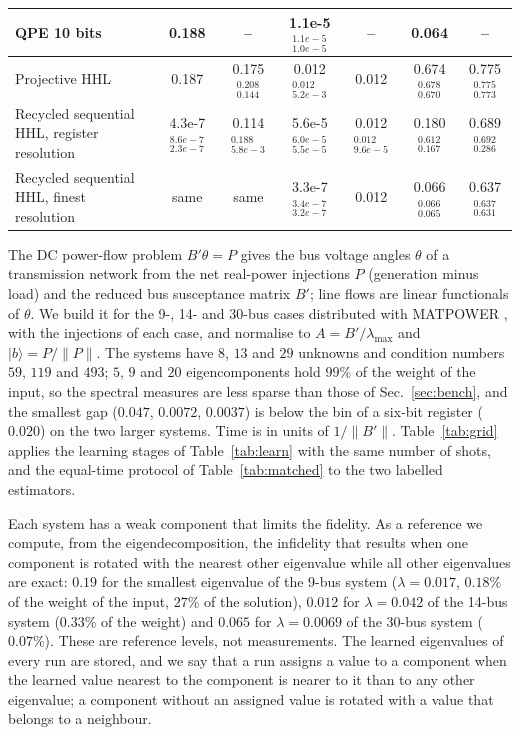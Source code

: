 \documentclass[journal]{IEEEtran}
\newcommand{\lmax}{\lambda_{\max}}
\begin{document}
\begin{table}[t]
\begin{tabular}{lcccccc}
QPE 10 bits & 0.188 & -- & 1.1e-5$_{1.0e-5}^{1.1e-5}$ & -- & 0.064 & --\\
\midrule
Projective HHL & 0.187 & 0.175$_{0.144}^{0.208}$ & 0.012$_{5.2e-3}^{0.012}$ & 0.012 & 0.674$_{0.670}^{0.678}$ & 0.775$_{0.773}^{0.775}$\\
Recycled sequential HHL, register resolution & 4.3e-7$_{2.3e-7}^{8.6e-7}$ & 0.114$_{5.8e-3}^{0.188}$ & 5.6e-5$_{5.5e-5}^{6.0e-5}$ & 0.012$_{9.6e-5}^{0.012}$ & 0.180$_{0.167}^{0.612}$ & 0.689$_{0.286}^{0.692}$\\
Recycled sequential HHL, finest resolution & same & same & 3.3e-7$_{3.2e-7}^{3.4e-7}$ & 0.012 & 0.066$_{0.065}^{0.066}$ & 0.637$_{0.631}^{0.637}$\\
\bottomrule
\end{tabular}
\end{table}

The DC power-flow problem $B'\theta=P$ gives the bus voltage angles $\theta$ of a transmission network from the net real-power injections $P$ (generation minus load) and the reduced bus susceptance matrix $B'$; line flows are linear functionals of $\theta$. We build it for the 9-, 14- and 30-bus cases distributed with MATPOWER \cite{Zimmerman2011}, with the injections of each case, and normalise to $A=B'/\lmax$ and $|b\rangle=P/\|P\|$. The systems have $8$, $13$ and $29$ unknowns and condition numbers $59$, $119$ and $493$; $5$, $9$ and $20$ eigencomponents hold $99\%$ of the weight of the input, so the spectral measures are less sparse than those of Sec.~\ref{sec:bench}, and the smallest gap ($0.047$, $0.0072$, $0.0037$) is below the bin of a six-bit register ($0.020$) on the two larger systems. Time is in units of $1/\|B'\|$. Table~\ref{tab:grid} applies the learning stages of Table~\ref{tab:learn} with the same number of shots, and the equal-time protocol of Table~\ref{tab:matched} to the two labelled estimators.

Each system has a weak component that limits the fidelity. As a reference we compute, from the eigendecomposition, the infidelity that results when one component is rotated with the nearest other eigenvalue while all other eigenvalues are exact: $0.19$ for the smallest eigenvalue of the 9-bus system ($\lambda=0.017$, $0.18\%$ of the weight of the input, $27\%$ of the solution), $0.012$ for $\lambda=0.042$ of the 14-bus system ($0.33\%$ of the weight) and $0.065$ for $\lambda=0.0069$ of the 30-bus system ($0.07\%$). These are reference levels, not measurements. The learned eigenvalues of every run are stored, and we say that a run assigns a value to a component when the learned value nearest to the component is nearer to it than to any other eigenvalue; a component without an assigned value is rotated with a value that belongs to a neighbour.
\end{document}
